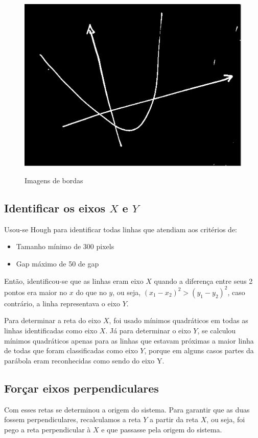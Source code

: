 \documentclass{article}
\begin{document}
\begin{figure}[h!]
        {\includegraphics[scale=0.17]{exemplo3_edge.PNG}}
    \caption{Imagens de bordas}
    \end{figure}

   \subsection{Identificar os eixos \(X\) e \(Y\)}
   Usou-se Hough para identificar todas linhas que atendiam aos critérios de:
   \begin{itemize}
       \item    Tamanho mínimo de 300 pixels
       \item    Gap máximo de 50 de gap
   \end{itemize}


   Então, identificou-se que as linhas eram eixo \(X\) quando a diferença entre seus 2 pontos era maior no \(x\) do que no \(y\), ou seja, \((x_1 - x_2)^2 > (y_1 - y_2) ^2\), caso contrário, a linha representava o eixo \(Y\).

  Para determinar a reta do eixo \(X\), foi usado mínimos quadráticos em todas as linhas identificadas como eixo \(X\). Já para determinar o eixo \(Y\), se calculou mínimos quadráticos apenas para as linhas que estavam próximas a maior linha de todas que foram classificadas como eixo \(Y\), porque em alguns casos partes da parábola eram reconhecidas como sendo do eixo Y.

 \subsection{Forçar eixos perpendiculares}
   Com esses retas se determinou a origem do sistema. Para garantir que as duas fossem perpendiculares, recalculamos a reta \(Y\) a partir da reta \(X\), ou seja, foi pego a reta perpendicular à \(X\) e que passasse pela origem do sistema.
\end{document}
